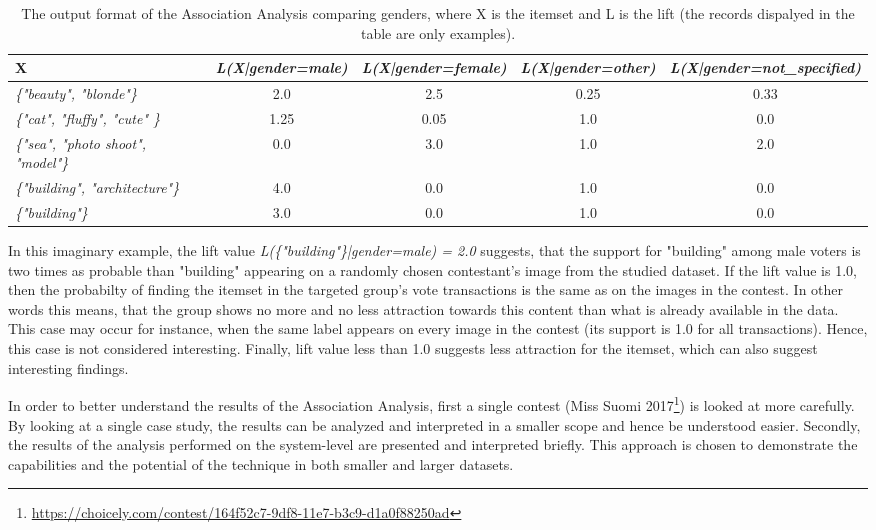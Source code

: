     \begin{table}[H]
        \centering
        \begin{adjustbox}{width=1\textwidth}
            \begin{tabular}{l|c|c|c|c}
                X & \emph{L(X|gender=male)} & \emph{L(X|gender=female)} & \emph{L(X|gender=other)} & \emph{L(X|gender=not\_specified)} \\
                \hline
                \emph{\{"beauty", "blonde"\}} & 2.0 & 2.5 & 0.25 & 0.33 \\
                \emph{\{"cat", "fluffy", "cute" \}} & 1.25 & 0.05 & 1.0 & 0.0 \\
                \emph{\{"sea", "photo shoot", "model"\}} & 0.0 & 3.0 & 1.0 & 2.0 \\
                \emph{\{"building", "architecture"\}} & 4.0 & 0.0 & 1.0 & 0.0 \\
                \emph{\{"building"\}} & 3.0 & 0.0 & 1.0 & 0.0
            \end{tabular}
        \end{adjustbox}
        \caption{The output format of the Association Analysis comparing genders, where X is the itemset and L is the lift (the records dispalyed in the table are only examples).}
        \label{itemset_lift_format}
    \end{table}

    In this imaginary example, the lift value \emph{L(\{"building"\}|gender=male) = 2.0} suggests, that the support for "building" among male voters is two times as probable than "building" appearing on a randomly chosen contestant's image from the studied dataset. If the lift value is 1.0, then the probabilty of finding the itemset in the targeted group's vote transactions is the same as on the images in the contest. In other words this means, that the group shows no more and no less attraction towards this content than what is already available in the data. This case may occur for instance, when the same label appears on every image in the contest (its support is 1.0 for all transactions). Hence, this case is not considered interesting. Finally, lift value less than 1.0 suggests less attraction for the itemset, which can also suggest interesting findings.

    In order to better understand the results of the Association Analysis, first a single contest (Miss Suomi 2017\footnote{\url{https://choicely.com/contest/164f52c7-9df8-11e7-b3c9-d1a0f88250ad}}) is looked at more carefully. By looking at a single case study, the results can be analyzed and interpreted in a smaller scope and hence be understood easier. Secondly, the results of the analysis performed on the system-level are presented and interpreted briefly. This approach is chosen to demonstrate the capabilities and the potential of the technique in both smaller and larger datasets.


